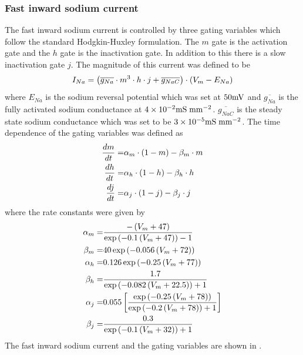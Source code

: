 \subsubsection{Fast inward sodium current}
\enlargethispage{-\baselineskip}
\enlargethispage{-\baselineskip}
\enlargethispage{-\baselineskip}
\enlargethispage{-\baselineskip}
\enlargethispage{-\baselineskip}
The fast inward sodium current is controlled by three gating variables which
follow the standard Hodgkin-Huxley formulation. The $m$ gate is the activation
gate and the $h$ gate is the inactivation gate. In addition to this there is a
slow inactivation gate $j$. The magnitude of this current was defined to be
\begin{equation}
  I_{Na}=\left( \overline{g_{Na}}\cdot m^3\cdot h\cdot
    j+\overline{g_{NaC}} \right)\cdot \left( V_m-E_{Na} \right)
\end{equation}
where $E_{Na}$ is the sodium reversal potential which was set at $50\mathrm{mV}$ and
$\overline{g_{Na}}$ is the fully activated sodium conductance at $4\times 10^{-2}
\mathrm{mS}\thickspace\mathrm{mm}^{-2}$. $\overline{g_{NaC}}$ is the steady state sodium conductance
which was set to be $3\times 10^{-5} \mathrm{mS}\thickspace\mathrm{mm}^{-2}$. The time
dependence of the gating variables was defined as
\begin{align}
  \label{eqn:br_mt}
   \dfrac{ d m}{d t} =&\alpha_m\cdot \left( 1-m \right)-\beta_m\cdot  m \\
  \label{eqn:br_ht}
   \dfrac{ d h}{d t} =&\alpha_h\cdot \left( 1-h \right)-\beta_h\cdot  h \\
  \label{eqn:br_jt}
   \dfrac{ d j}{d t} =&\alpha_j\cdot \left( 1-j \right)-\beta_j\cdot  j
\end{align}
where the rate constants were given by
\begin{align}
  \alpha_m =& \dfrac{-\left( V_m+47 \right)}{\exp\left( -0.1\left( V_m+47 \right) \right)-1} \\
  \beta_m =& 40\exp\left( -0.056\left( V_m+72 \right) \right) \\
  \alpha_h =& 0.126\exp\left( -0.25\left( V_m+77 \right) \right) \\
  \beta_h =& \dfrac{1.7}{\exp\left( -0.082\left( V_m+22.5 \right) \right)+1} \\
  \alpha_j =& 0.055\left[ \dfrac{\exp\left( -0.25\left( V_m+78 \right) \right)}{\exp\left( -0.2\left( V_m+78 \right) \right)+1} \right] \\
  \beta_j =&  \dfrac{0.3}{\exp\left( -0.1\left( V_m+32 \right) \right)+1}
\end{align}
The fast inward sodium current and the gating variables are shown in
.

